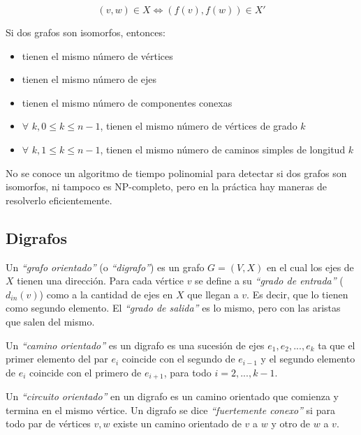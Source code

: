 \begin{figure}[h]
\[ (v,w) \in X \Longleftrightarrow (f(v), f(w)) \in X' \]
\end{figure}

Si dos grafos son isomorfos, entonces:

\begin{itemize}
\item tienen el mismo n\'umero de v\'ertices
\item tienen el mismo n\'umero de ejes
\item tienen el mismo n\'umero de componentes conexas
\item $\forall$ $k, 0 \leq k \leq n-1$, tienen el mismo n\'umero de v\'ertices de grado $k$
\item $\forall$ $k, 1 \leq k \leq n-1$, tienen el mismo n\'umero de caminos simples de longitud $k$
\end{itemize}

No se conoce un algoritmo de tiempo polinomial para detectar si dos grafos son isomorfos, ni tampoco es NP-completo, pero en la pr\'actica hay maneras de resolverlo eficientemente.

\newpage
\subsection{Digrafos}

Un \emph{``grafo orientado''} (o \emph{``digrafo''}) es un grafo $G=(V,X)$ en el cual los ejes de $X$ tienen una direcci\'on. Para cada v\'ertice $v$ se define a su \emph{``grado de entrada''} ($d_{in}(v)$) como a la cantidad de ejes en $X$ que llegan a $v$. Es decir, que lo tienen como segundo elemento. El \emph{``grado de salida''} es lo mismo, pero con las aristas que salen del mismo.

Un \emph{``camino orientado''} es un digrafo es una sucesi\'on de ejes $e_1, e_2, ..., e_k$ ta que el primer elemento del par $e_i$ coincide con el segundo de $e_{i-1}$ y el segundo elemento de $e_i$ coincide con el primero de $e_{i+1}$, para todo $i = 2, ..., k-1$.

Un \emph{``circuito orientado''} en un digrafo es un camino orientado que comienza y termina en el mismo v\'ertice. Un digrafo se dice \emph{``fuertemente conexo''} si para todo par de v\'ertices $v,w$ existe un camino orientado de $v$ a $w$ y otro de $w$ a $v$.